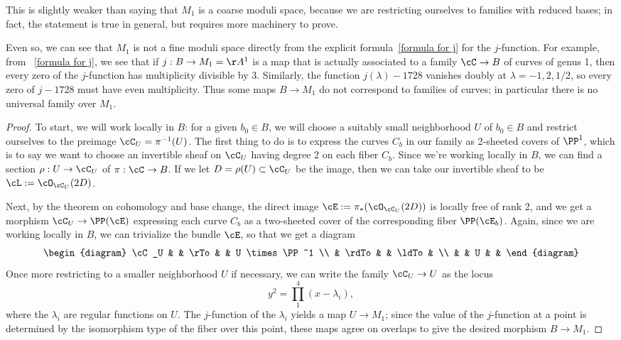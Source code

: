 This is slightly weaker than saying that $M_1$ is a coarse moduli space, because we are restricting ourselves to families with reduced bases; in fact, the statement is true in general, but requires more machinery to prove.

Even so, we can see that $M_1$ is not a fine moduli space directly from the explicit formula~\ref{formula for j} for the $j$-function. For example, from ~\ref{formula for j}, we see that if $j : B \to M_1 = \AA^1$ is a map that is actually associated to a family $\cC \to B$ of curves of genus 1, then every zero of the $j$-function has multiplicity divisible by 3.  Similarly, the function $j(\lambda)-1728$ vanishes doubly at $\lambda = -1, 2, 1/2$, so every zero of $j - 1728$ must have even multiplicity. Thus some maps $B\to M_1$ do not correspond to families of curves; in particular there is no universal family over $M_1$. 


\begin{proof}
To start, we will work locally in $B$: for a given $b_0 \in B$, we will choose a suitably small neighborhood $U$ of $b_0 \in B$ and restrict ourselves to the preimage $\cC_U = \pi^{-1}(U)$. The first thing to do is to express the curves $C_b$ in our family as 2-sheeted covers of $\PP^1$, which is to say we want to choose an invertible sheaf on $\cC_U$ having degree 2 on each fiber $C_b$. Since we're working locally in $B$,
we can find a section $\rho : U \to \cC_U$ of $\pi : \cC \to B$. If we let $D = \rho(U) \subset \cC_U$ be the image, then we can take our invertible sheaf to be $\cL := \cO_{\cC_U}(2D)$.

Next, by the theorem on cohomology and base change, the direct image $\cE := \pi_*(\cO_{\cC_U}(2D))$ is locally free of rank 2, and we get a morphism $\cC_U \to \PP(\cE)$ expressing each curve $C_b$ as a two-sheeted cover of the corresponding fiber $\PP(\cE_b)$. Again, since we are working locally in $B$, we can trivialize the bundle $\cE$, so that we get a diagram
$$
\begin{diagram}
\cC_U & & \rTo & & U \times \PP^1 \\
& \rdTo & & \ldTo & \\
& & U & &
\end{diagram} 
$$
Once more restricting to a smaller neighborhood $U$ if necessary, we can write the family $\cC_U \to U$ as the locus
$$
y^2 = \prod_1^4 (x - \lambda_i),
$$
where the $\lambda_i$ are regular functions on $U$. The $j$-function of the $\lambda_i$  yields a map $U \to M_1$; since the value of the $j$-function at a point is determined by the isomorphism type of the fiber over this point, these maps agree on overlaps to give  the desired morphism $B \to M_1$.
\end{proof}



